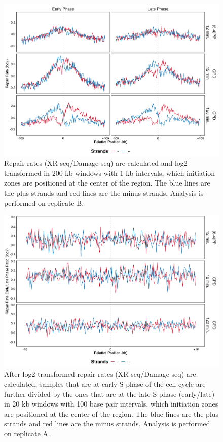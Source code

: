\begin{figure}[H]
\begin{center}
\includegraphics[width=\textwidth]{Chapters/7_appendix/figures/supfig37}
\caption[Repair rate of initiation zones in 200 kb (replicate B).]{Repair rates (XR-seq/Damage-seq) are calculated and log2 transformed in 200 kb windows with 1 kb intervals, which initiation zones are positioned at the center of the region. The blue lines are the plus strands and red lines are the minus strands. Analysis is performed on replicate B.}
\label{supfig:rr200inzonesB}
\end{center}
\end{figure}

\begin{figure}[H]
\begin{center}
\includegraphics[width=\textwidth]{Chapters/7_appendix/figures/supfig38}
\caption[Repair rate early/late ratio of initiation zones in 20 kb (replicate A).]{After log2 transformed repair rates (XR-seq/Damage-seq) are calculated, samples that are at early S phase of the cell cycle are further divided by the ones that are at the late S phase (early/late) in 20 kb windows with 100 base pair intervals, which initiation zones are positioned at the center of the region. The blue lines are the plus strands and red lines are the minus strands. Analysis is performed on replicate A.}
\label{supfig:rrel20inzonesA}
\end{center}
\end{figure}

